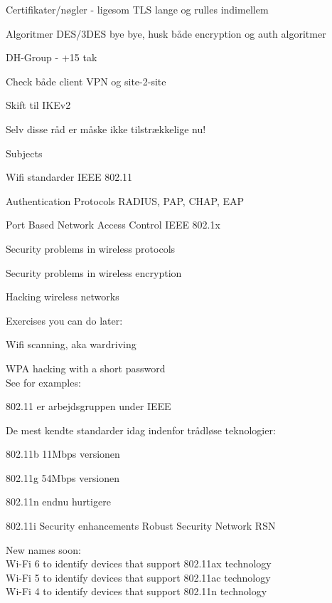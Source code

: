\documentclass[Screen16to9,17pt]{foils}
\begin{document}
\begin{list2}
\item Certifikater/nøgler - ligesom TLS lange og rulles indimellem
\item Algoritmer DES/3DES bye bye, husk både encryption og auth algoritmer
\item DH-Group - +15 tak
\item Check både client VPN og site-2-site
\item Skift til IKEv2
\item Selv disse råd er måske ikke tilstrækkelige nu!
\end{list2}



\begin{list1}
\item Subjects
\begin{list2}

\item Wifi standarder IEEE 802.11
\item Authentication Protocols RADIUS, PAP, CHAP, EAP
\item Port Based Network Access Control IEEE 802.1x
\item Security problems in wireless protocols
\item Security problems in wireless encryption
\item Hacking wireless networks
\end{list2}
\item Exercises you can do later:
\begin{list2}
\item Wifi scanning, aka wardriving
\item WPA hacking with a short password\\
See for examples: 
\end{list2}
\end{list1}




\begin{list1}
\item 802.11 er arbejdsgruppen under IEEE
\item De mest kendte standarder idag indenfor trådløse teknologier:
\begin{list2}
\item 802.11b 11Mbps versionen
\item 802.11g 54Mbps versionen
\item 802.11n endnu hurtigere
\item 802.11i Security enhancements Robust Security Network RSN
\end{list2}
\item New names soon:\\
Wi-Fi 6 to identify devices that support 802.11ax technology\\
Wi-Fi 5 to identify devices that support 802.11ac technology\\
Wi-Fi 4 to identify devices that support 802.11n technology
\end{list1}
\end{document}
